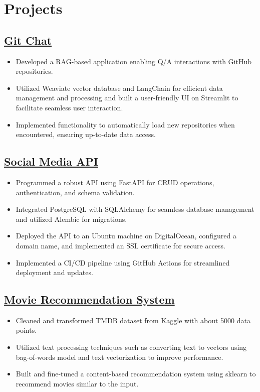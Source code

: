 \documentclass[a4paper,11pt]{article}
\begin{document}
\section*{Projects}
\vspace{-2mm}
\subsection*{\href{https://github.com/kanakOS01/git-chat}{Git Chat}}
\begin{itemize}[itemsep=0pt,parsep=0pt,topsep=0pt,partopsep=0pt]
    \item Developed a RAG-based application enabling Q/A interactions with GitHub repositories.
    \item Utilized Weaviate vector database and LangChain for efficient data management and processing and built a user-friendly UI on Streamlit to facilitate seamless user interaction.
    \item Implemented functionality to automatically load new repositories when encountered, ensuring up-to-date data access.
\end{itemize}
\vspace{-3mm}

\subsection*{\href{https://github.com/kanakOS01/social-media-fastapi}{Social Media API}}
\begin{itemize}[itemsep=0pt,parsep=0pt,topsep=0pt,partopsep=0pt]
    \item Programmed a robust API using FastAPI for CRUD operations, authentication, and schema validation.
    \item Integrated PostgreSQL with SQLAlchemy for seamless database management and utilized Alembic for migrations.
    \item Deployed the API to an Ubuntu machine on DigitalOcean, configured a domain name, and implemented an SSL certificate for secure access.
    \item Implemented a CI/CD pipeline using GitHub Actions for streamlined deployment and updates.
\end{itemize}
\vspace{-3mm}

\subsection*{\href{https://github.com/kanakOS01/movie-recommender-system}{Movie Recommendation System}}
\begin{itemize}[itemsep=0pt,parsep=0pt,topsep=0pt,partopsep=0pt]
    \item Cleaned and transformed TMDB dataset from Kaggle with about 5000 data points.
    \item Utilized text processing techniques such as converting text to vectors using bag-of-words model and text vectorization to improve performance. 
    \item Built and fine-tuned a content-based recommendation system using sklearn to recommend movies similar to the input.
\end{itemize}
\vspace{-3mm}
\end{document}
